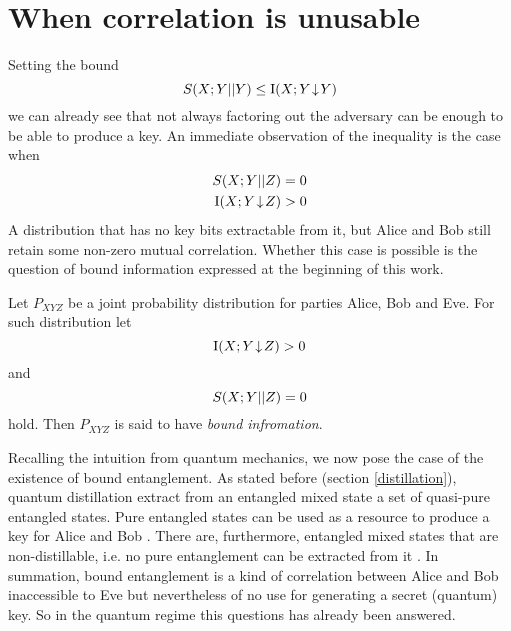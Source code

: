 \section{When correlation is unusable}
Setting the bound
$$S(X;Y||Y) \leq \operatorname{I}(X;Y\!\downarrow\!Y)$$
we can already see that not always factoring out the adversary can be enough to be able to produce a key.
An immediate observation of the inequality is the case when
\begin{align*}
	S(X;Y||Z) & = 0 \\
	\operatorname{I}(X;Y\!\downarrow\!Z) & > 0 
\end{align*}
A distribution that has no key bits extractable from it, but Alice and Bob still retain some non-zero mutual correlation.
Whether this case is possible is the question of bound information expressed at the beginning of this work.
\begin{definition}\cite{GisWolf00, RW03} 
Let $P_{XYZ}$ be a joint probability distribution for parties Alice, Bob and Eve.
For such distribution let 
\begin{equation}
	\operatorname{I}(X;Y\!\downarrow\!Z) > 0
\end{equation}
and 
\begin{equation}
S(X;Y||Z) = 0
\end{equation}
hold.
Then $P_{XYZ}$ is said to have \emph{bound infromation}.
\end{definition}

Recalling the intuition from quantum mechanics, we now pose the case of the existence of bound entanglement.
As stated before (section \ref{distillation}), quantum distillation extract from an entangled mixed state a set of quasi-pure entangled states.
Pure entangled states can be used as a resource to produce a key for Alice and Bob \cite{Ekert91}.
There are, furthermore, entangled mixed states that are non-distillable, i.e. no pure entanglement can be extracted from it \cite{3H98}.
In summation, bound entanglement is a kind of correlation between Alice and Bob inaccessible to Eve but nevertheless of no use for generating a secret (quantum) key.
So in the quantum regime this questions has already been answered.

	
	
	
		
